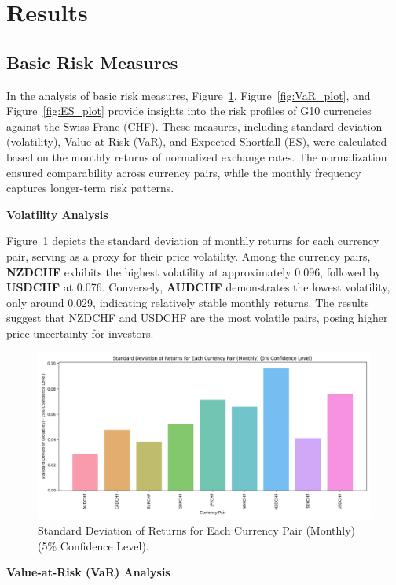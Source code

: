\documentclass{article}
\begin{document}
\section{Results}
\subsection{Basic Risk Measures}

In the analysis of basic risk measures, Figure~\ref{fig:volatility_plot}, Figure~\ref{fig:VaR_plot}, and Figure~\ref{fig:ES_plot} provide insights into the risk profiles of G10 currencies against the Swiss Franc (CHF). These measures, including standard deviation (volatility), Value-at-Risk (VaR), and Expected Shortfall (ES), were calculated based on the monthly returns of normalized exchange rates. The normalization ensured comparability across currency pairs, while the monthly frequency captures longer-term risk patterns.

\textbf{Volatility Analysis}

Figure~\ref{fig:volatility_plot} depicts the standard deviation of monthly returns for each currency pair, serving as a proxy for their price volatility. Among the currency pairs, \textbf{NZDCHF} exhibits the highest volatility at approximately 0.096, followed by \textbf{USDCHF} at 0.076. Conversely, \textbf{AUDCHF} demonstrates the lowest volatility, only around 0.029, indicating relatively stable monthly returns. The results suggest that NZDCHF and USDCHF are the most volatile pairs, posing higher price uncertainty for investors.

\begin{figure}[H]
    \centering
    \includegraphics[width=0.75\linewidth]{../../reports/figures/volatility_plot.png}
    \caption{Standard Deviation of Returns for Each Currency Pair (Monthly) (5\% Confidence Level).}
    \label{fig:volatility_plot}
\end{figure}

\textbf{Value-at-Risk (VaR) Analysis}
\end{document}

